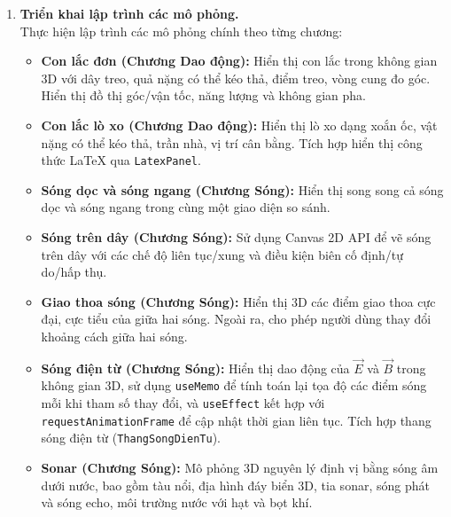 \begin{enumerate}
    \item \textbf{Triển khai lập trình các mô phỏng.} \\
    Thực hiện lập trình các mô phỏng chính theo từng chương:
    \begin{itemize}
        \item \textbf{Con lắc đơn (Chương Dao động):} Hiển thị con lắc trong không gian 3D với dây treo, quả nặng có thể kéo thả, điểm treo, vòng cung đo góc. Hiển thị đồ thị góc/vận tốc, năng lượng và không gian pha.
        \item \textbf{Con lắc lò xo (Chương Dao động):} Hiển thị lò xo dạng xoắn ốc, vật nặng có thể kéo thả, trần nhà, vị trí cân bằng. Tích hợp hiển thị công thức LaTeX qua \texttt{LatexPanel}.
        \item \textbf{Sóng dọc và sóng ngang (Chương Sóng):} Hiển thị song song cả sóng dọc và sóng ngang trong cùng một giao diện so sánh.
        \item \textbf{Sóng trên dây (Chương Sóng):} Sử dụng Canvas 2D API để vẽ sóng trên dây với các chế độ liên tục/xung và điều kiện biên cố định/tự do/hấp thụ.
        \item \textbf{Giao thoa sóng (Chương Sóng):} Hiển thị 3D các điểm giao thoa cực đại, cực tiểu của giữa hai sóng. Ngoài ra, cho phép người dùng thay đổi khoảng cách giữa hai sóng.
        \item \textbf{Sóng điện từ (Chương Sóng):} Hiển thị dao động của $\vec{E}$ và $\vec{B}$ trong không gian 3D, sử dụng \texttt{useMemo} để tính toán lại tọa độ các điểm sóng mỗi khi tham số thay đổi, và \texttt{useEffect} kết hợp với \texttt{requestAnimationFrame} để cập nhật thời gian liên tục. Tích hợp thang sóng điện từ (\texttt{ThangSongDienTu}).
        \item \textbf{Sonar (Chương Sóng):} Mô phỏng 3D nguyên lý định vị bằng sóng âm dưới nước, bao gồm tàu nổi, địa hình đáy biển 3D, tia sonar, sóng phát và sóng echo, môi trường nước với hạt và bọt khí.
    \end{itemize}


\end{enumerate}
